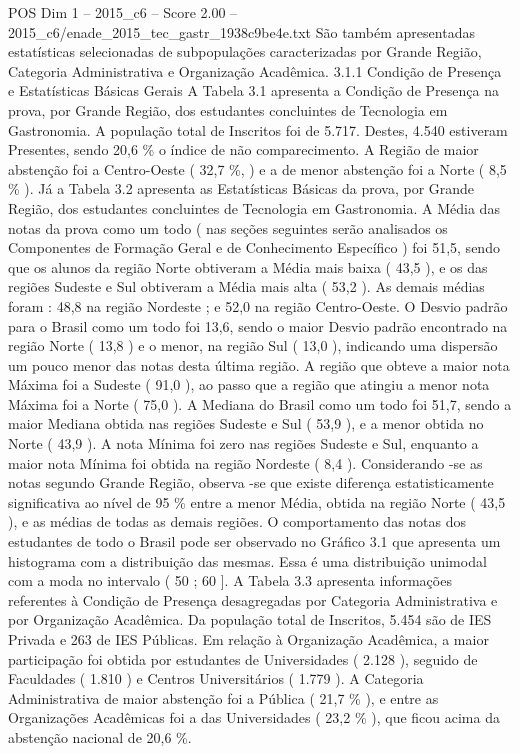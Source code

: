 \begin{textsample}{POS Dim 1 – 2015\_c6 – Score 2.00 – 2015\_c6/enade\_2015\_tec\_gastr\_1938c9be4e.txt}
São também apresentadas estatísticas selecionadas de subpopulações caracterizadas por Grande Região, Categoria Administrativa e Organização Acadêmica. 3.1.1 Condição de Presença e Estatísticas Básicas Gerais A Tabela 3.1 apresenta a Condição de Presença na prova, por Grande Região, dos estudantes concluintes de Tecnologia em Gastronomia.
A população total de Inscritos foi de 5.717.
Destes, 4.540 estiveram Presentes, sendo 20,6 \% o índice de não comparecimento.
A Região de maior abstenção foi a Centro-Oeste ( 32,7 \%, ) e a de menor abstenção foi a Norte ( 8,5 \% ).
Já a Tabela 3.2 apresenta as Estatísticas Básicas da prova, por Grande Região, dos estudantes concluintes de Tecnologia em Gastronomia.
A Média das notas da prova como um todo ( nas seções seguintes serão analisados os Componentes de Formação Geral e de Conhecimento Específico ) foi 51,5, sendo que os alunos da região Norte obtiveram a Média mais baixa ( 43,5 ), e os das regiões Sudeste e Sul obtiveram a Média mais alta ( 53,2 ).
As demais médias foram : 48,8 na região Nordeste ; e 52,0 na região Centro-Oeste.
O Desvio padrão para o Brasil como um todo foi 13,6, sendo o maior Desvio padrão encontrado na região Norte ( 13,8 ) e o menor, na região Sul ( 13,0 ), indicando uma dispersão um pouco menor das notas desta última região.
A região que obteve a maior nota Máxima foi a Sudeste ( 91,0 ), ao passo que a região que atingiu a menor nota Máxima foi a Norte ( 75,0 ).
A Mediana do Brasil como um todo foi 51,7, sendo a maior Mediana obtida nas regiões Sudeste e Sul ( 53,9 ), e a menor obtida no Norte ( 43,9 ).
A nota Mínima foi zero nas regiões Sudeste e Sul, enquanto a maior nota Mínima foi obtida na região Nordeste ( 8,4 ).
Considerando -se as notas segundo Grande Região, observa -se que existe diferença estatisticamente significativa ao nível de 95 \% entre a menor Média, obtida na região Norte ( 43,5 ), e as médias de todas as demais regiões.
O comportamento das notas dos estudantes de todo o Brasil pode ser observado no Gráfico 3.1 que apresenta um histograma com a distribuição das mesmas.
Essa é uma distribuição unimodal com a moda no intervalo ( 50 ; 60 ].
A Tabela 3.3 apresenta informações referentes à Condição de Presença desagregadas por Categoria Administrativa e por Organização Acadêmica.
Da população total de Inscritos, 5.454 são de IES Privada e 263 de IES Públicas.
Em relação à Organização Acadêmica, a maior participação foi obtida por estudantes de Universidades ( 2.128 ), seguido de Faculdades ( 1.810 ) e Centros Universitários ( 1.779 ).
A Categoria Administrativa de maior abstenção foi a Pública ( 21,7 \% ), e entre as Organizações Acadêmicas foi a das Universidades ( 23,2 \% ), que ficou acima da abstenção nacional de 20,6 \%.

\end{textsample}
